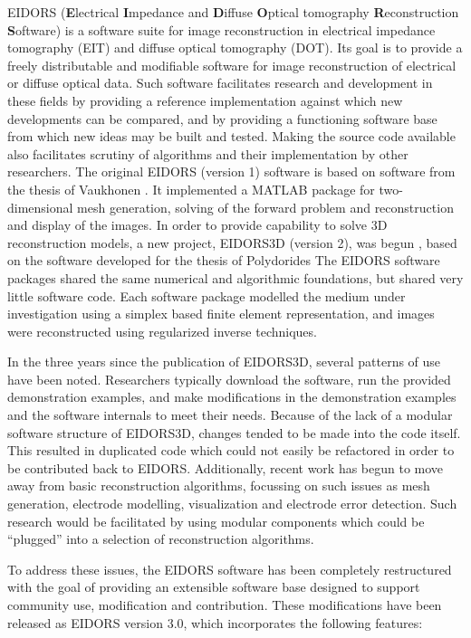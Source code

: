 \documentclass[12pt]{iopart}
\begin{document}
EIDORS
({\bf E}lectrical
 {\bf I}mpedance and
 {\bf D}iffuse
 {\bf O}ptical tomography
 {\bf R}econstruction
 {\bf S}oftware)
is a software suite for image reconstruction in
electrical impedance tomography (EIT) and diffuse optical tomography (DOT).
Its goal is to provide a freely distributable and modifiable
software for image reconstruction of electrical 
or diffuse optical data. Such software facilitates research
and development
in these fields by providing a reference implementation
against which new developments can be compared, and by
providing a functioning software base from which new
ideas may be built and tested.
Making the source code available also facilitates scrutiny
of algorithms and their implementation by other researchers.
The original EIDORS (version 1) software \cite{Vauhkonen_etal_2000}
is based on software from the thesis of Vaukhonen \cite{Vauhkonen_1997}.
It implemented a MATLAB package for two-dimensional mesh generation,
solving of the forward
problem and reconstruction and display of the images.
In order to provide capability to solve 3D reconstruction models,
a new project, EIDORS3D (version 2), was begun \cite{Polydorides_and_Lionheart_2002},
based on the software developed for the thesis of Polydorides \cite{Polydorides_2002}
The EIDORS software packages shared the same numerical
and algorithmic foundations, but shared very little software code.
Each software package modelled the medium under investigation
using a simplex based finite element representation,
and images were reconstructed using regularized inverse techniques.

In the three years since the publication of EIDORS3D, several patterns
of use have been noted. Researchers typically download the software,
run the provided demonstration examples,  and 
make modifications in the demonstration examples and the software
internals to meet their needs.
Because of the lack of a modular software structure of EIDORS3D,
changes tended to be made into the code itself. This resulted in
duplicated
code which could not easily be refactored in order to
be contributed back to EIDORS. Additionally, recent work has begun to move
away from basic reconstruction algorithms, focussing
on such issues as mesh generation, electrode modelling, visualization
and electrode error detection. Such research would be facilitated
by using modular components which could be ``plugged'' into
a selection of reconstruction algorithms.

To address these issues, the EIDORS software has been completely
restructured with the goal of providing an extensible software base
designed to support community use, modification and contribution.
These modifications have been released as EIDORS version 3.0,
which incorporates the following features:
\end{document}
